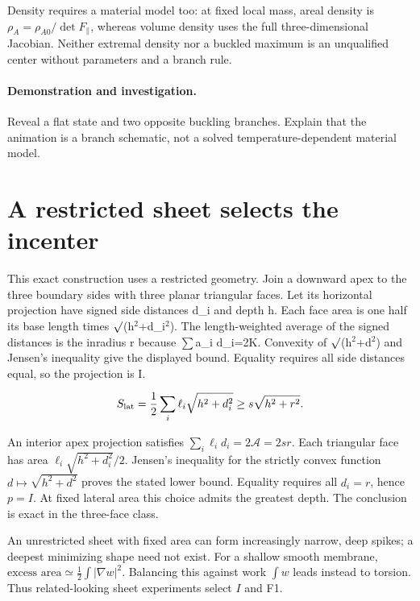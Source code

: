 \documentclass[11pt,oneside,openany]{book}
\begin{document}
Density requires a material model too: at fixed local mass,
areal density is $\rho_A=\rho_{A0}/\det F_\parallel$, whereas volume
density uses the full three-dimensional Jacobian. Neither extremal
density nor a buckled maximum is an unqualified center without
parameters and a branch rule.




\paragraph{Demonstration and investigation.} Reveal a flat state and two opposite buckling branches. Explain that the animation is a branch schematic, not a solved temperature-dependent material model.


\section{A restricted sheet selects the incenter}\label{sec:slide42}

This exact construction uses a restricted geometry. Join a downward apex to the three boundary sides with three planar triangular faces. Let its horizontal projection have signed side distances d\_i and depth h. Each face area is one half its base length times \ensuremath{\sqrt{\vphantom{x}}}(h\ensuremath{^2}+d\_i\ensuremath{^2}). The length-weighted average of the signed distances is the inradius r because \ensuremath{\sum}a\_i d\_i=2K. Convexity of \ensuremath{\sqrt{\vphantom{x}}}(h\ensuremath{^2}+d\ensuremath{^2}) and Jensen's inequality give the displayed bound. Equality requires all side distances equal, so the projection is I.


\[S_{\rm lat}=\frac12\sum_i\ell_i\sqrt{h^2+d_i^2}\ge s\sqrt{h^2+r^2}.\]



An interior apex projection satisfies
$\sum_i\ell_i d_i=2\mathcal A=2sr$.
Each triangular face has area
$\ell_i\sqrt{h^2+d_i^2}/2$.
Jensen's inequality for the strictly convex function
$d\mapsto\sqrt{h^2+d^2}$ proves the stated lower bound.
Equality requires all $d_i=r$, hence $p=I$.
At fixed lateral area this choice admits the greatest depth.
The conclusion is exact in the three-face class.

An unrestricted sheet with fixed area can form increasingly narrow,
deep spikes; a deepest minimizing shape need not exist.
For a shallow smooth membrane,
$\text{excess area}\simeq\frac12\int|\nabla w|^2$.
Balancing this against work $\int w$ leads instead to torsion.
Thus related-looking sheet experiments select $I$ and F1.
\end{document}
